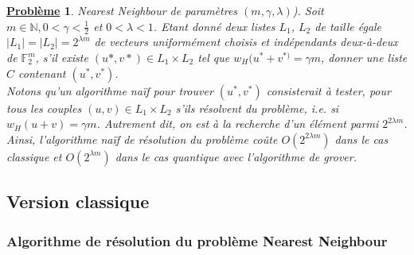 \documentclass[12pt,openany]{report}
\newtheorem{problem}{\underline{Problème}}
\begin{document}
\begin{problem}
Nearest Neighbour de paramètres $(m,\gamma,\lambda) $). Soit $  m \in \mathbb{N}, 0 < \gamma< \frac{1}{2}  $ et $0< \lambda <1 $. Etant donné deux listes $L_1 $, $  L_2$ de taille égale $\mid L_1 \mid= \mid L_2 \mid = 2^{\lambda m} $ de vecteurs uniformément choisis et indépendants deux-à-deux de $\mathbb{F}_{2}^{m}  $, s'il existe $(u* , v*) \in L_1 \times L_2   $ tel que $ w_H(u^{*} + v^{*)}=\gamma m  $, donner une liste $\mathit{C} $ contenant $ (u^{*} , v^{*}) $.\\
Notons qu'un algorithme naïf pour trouver $(u^{*}, v^{*})$ consisterait à tester, pour tous les couples $(u,v)\in L_1 \times L_2 $ s'ils résolvent du problème, i.e. si $ w_H(u + v)=\gamma m  $. Autrement dit, on est à la recherche d'un élément parmi $2^{2\lambda m} $. Ainsi, l'algorithme naïf de résolution du problème coûte $ O(2^{2\lambda m}) $ dans le cas classique et $O(2^{\lambda m})  $ dans le cas quantique avec l'algorithme de grover.

\end{problem}

\subsection{Version classique}
\subsubsection{Algorithme de résolution du problème Nearest Neighbour }
\end{document}
